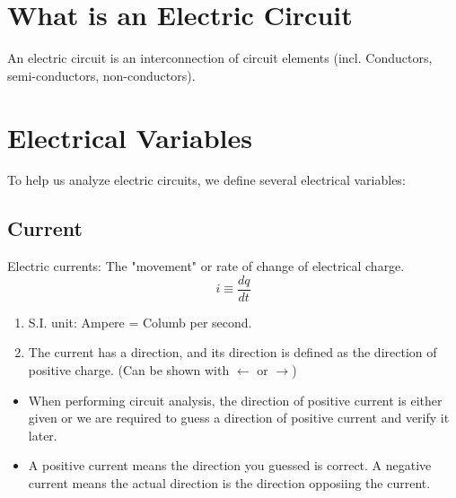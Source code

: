 \documentclass{article}
\begin{document}
\tableofcontents
\section{What is an Electric Circuit}
\begin{definition}
    An electric circuit is an interconnection of circuit elements (incl. Conductors, semi-conductors, non-conductors). 
\end{definition}

\section{Electrical Variables}
    To help us analyze electric circuits, we define several electrical variables:
    \subsection{Current}
    \begin{definition}
        Electric currents: The "movement" or rate of change of electrical charge. 
        \begin{equation}
            i\equiv\frac{dq}{dt}
        \end{equation} 
        
        \begin{enumerate}
            \item S.I. unit: Ampere = Columb per second.
            \item The current has a direction, and its direction is defined as the direction of positive charge. (Can be shown with $\leftarrow$ or $\rightarrow$)
        \end{enumerate}
    \end{definition}
    \begin{itemize}
        \item When performing circuit analysis, the direction of positive current is either given or we are required to guess a direction of positive current and verify it later. 
        \item A positive current means the direction you guessed is correct. A negative current means the actual direction is the direction opposiing the current.
    \end{itemize}
\end{document}
